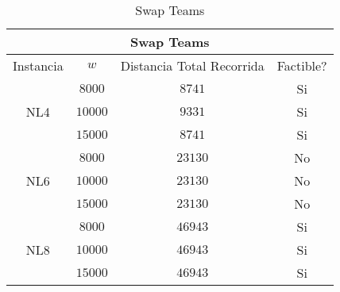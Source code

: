 \documentclass[letter, 10pt]{article}
\begin{document}
\begin{table}[h]
\centering
\label{my-label}
\begin{tabular}{cccc}
\multicolumn{4}{c}{\textbf{Swap Teams}}                                                                                                                     \\ \hline
\multicolumn{1}{|c|}{Instancia}            & \multicolumn{1}{c|}{$w$}     & \multicolumn{1}{c|}{Distancia Total  Recorrida} & \multicolumn{1}{c|}{Factible?} \\ \hline
\multicolumn{1}{|c|}{\multirow{3}{*}{NL4}} & \multicolumn{1}{c|}{$8000$}  & \multicolumn{1}{c|}{$8741$}                     & \multicolumn{1}{c|}{Si}        \\ \cline{2-4} 
\multicolumn{1}{|c|}{}                     & \multicolumn{1}{c|}{$10000$} & \multicolumn{1}{c|}{$9331$}                     & \multicolumn{1}{c|}{Si}        \\ \cline{2-4} 
\multicolumn{1}{|c|}{}                     & \multicolumn{1}{c|}{$15000$} & \multicolumn{1}{c|}{$8741$}                     & \multicolumn{1}{c|}{Si}        \\ \hline
\multicolumn{1}{|c|}{\multirow{3}{*}{NL6}} & \multicolumn{1}{c|}{$8000$}  & \multicolumn{1}{c|}{$23130$}                    & \multicolumn{1}{c|}{No}        \\ \cline{2-4} 
\multicolumn{1}{|c|}{}                     & \multicolumn{1}{c|}{$10000$} & \multicolumn{1}{c|}{$23130$}                    & \multicolumn{1}{c|}{No}        \\ \cline{2-4} 
\multicolumn{1}{|c|}{}                     & \multicolumn{1}{c|}{$15000$} & \multicolumn{1}{c|}{$23130$}                    & \multicolumn{1}{c|}{No}        \\ \hline
\multicolumn{1}{|c|}{\multirow{3}{*}{NL8}} & \multicolumn{1}{c|}{$8000$}  & \multicolumn{1}{c|}{$46943$}                    & \multicolumn{1}{c|}{Si}        \\ \cline{2-4} 
\multicolumn{1}{|c|}{}                     & \multicolumn{1}{c|}{$10000$} & \multicolumn{1}{c|}{$46943$}                    & \multicolumn{1}{c|}{Si}        \\ \cline{2-4} 
\multicolumn{1}{|c|}{}                     & \multicolumn{1}{c|}{$15000$} & \multicolumn{1}{c|}{$46943$}                    & \multicolumn{1}{c|}{Si}        \\ \hline
\end{tabular}
\caption{Swap Teams}
\end{table}
\end{document}

